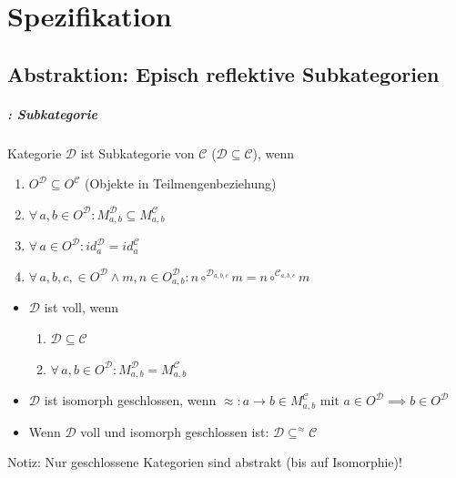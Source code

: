 \chapter{Spezifikation}

\section{Abstraktion: Episch reflektive Subkategorien}

\paragraph{: Subkategorie}
Kategorie $\mathcal{D}$ ist Subkategorie von $\mathcal{C}$ ($\mathcal{D} \subseteq \mathcal{C}$), wenn
\begin{enumerate}
\item $O^\mathcal{D} \subseteq O^\mathcal{C}$ (Objekte in Teilmengenbeziehung)
\item $\forall \, a,b \in O^\mathcal{D}:  M^\mathcal{D}_{a,b} \subseteq M^\mathcal{C}_{a,b} $
\item $\forall \, a \in O^\mathcal{D}: id^\mathcal{D}_a = id^\mathcal{C}_a$
\item $\forall \, a,b,c, \in O^\mathcal{D} \wedge m,n \in O^\mathcal{D}_{a,b}: n \circ^{\mathcal{D}_{a,b,c}} m  = n \circ^{\mathcal{C}_{a,b,c}} m  $
\end{enumerate}

\begin{itemize}
\item $\mathcal{D}$ ist voll, wenn
\begin{enumerate}
\item $\mathcal{D} \subseteq \mathcal{C}$
\item $\forall \, a,b \in O^\mathcal{D}:  M^\mathcal{D}_{a,b} = M^\mathcal{C}_{a,b} $
\end{enumerate}
\item $\mathcal{D}$ ist isomorph geschlossen, wenn $\approx: a \rightarrow b \in M^\mathcal{C}_{a,b} \text{ mit } a \in O^\mathcal{D} \implies b \in O^\mathcal{D}$
\item Wenn $\mathcal{D}$ voll und isomorph geschlossen ist: $\mathcal{D} \subseteq^{\approx} \mathcal{C}$
\end{itemize}

Notiz: Nur geschlossene Kategorien sind abstrakt (bis auf Isomorphie)!

